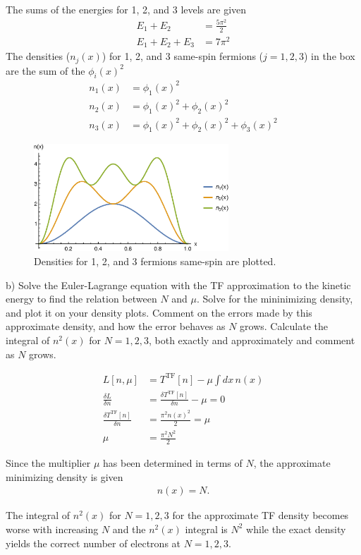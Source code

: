 \documentclass{article}
\begin{document}
{\color{blue} The sums of the energies for 1, 2, and 3 levels are given
  \begin{align}
    E_1 + E_2 & = \frac{5\pi^2}{2} \\
    E_1 + E_2 + E_3 & = 7\pi^2
  \end{align}
  The densities ($n_j(x)$) for 1, 2, and 3 same-spin fermions ($j=1,2,3$)
  in the box are the sum of the $\phi_i(x)^2$
  \begin{align}
    n_1(x) & = \phi_1(x)^2 \\
    n_2(x) & = \phi_1(x)^2 + \phi_2(x)^2 \\
    n_3(x) & = \phi_1(x)^2 + \phi_2(x)^2 + \phi_3(x)^2
  \end{align}
}
\begin{figure}[H]
  \centering
  \includegraphics[width=0.65\textwidth]{box_dens.eps}
  \caption{Densities for 1, 2, and 3 fermions same-spin are plotted.}
  \label{fig:box_dens}
\end{figure}

\noindent b) Solve the Euler-Lagrange equation with the TF approximation
to the kinetic energy to find the relation between $N$ and $\mu$.  Solve
for the mininimizing density, and plot it on your density plots.  Comment
on the errors made by this approximate density, and how the error behaves
as $N$ grows.  Calculate the integral of $n^2(x)$ for $N=1,2,3$, both exactly
and approximately and comment as $N$ grows.
\\

{\color{blue}
  \begin{align}
    L[n,\mu] & = T^{\text{TF}}[n] -\mu \int dx\, n(x) \\
    \frac{\delta L}{\delta n} & = \frac{\delta T^{\text{TF}}[n]}{\delta n} - \mu = 0 \\
    \frac{\delta T^{\text{TF}}[n]}{\delta n} & = \frac{\pi^2n(x)^2}{2} = \mu \\
    \mu & = \frac{\pi^2N^2}{2}
  \end{align}

  Since the multiplier $\mu$ has been determined in terms of $N$, the
  approximate minimizing density is given
  \begin{align}
    n(x) = N.
  \end{align}

  The integral of $n^2(x)$ for $N=1,2,3$ for the approximate TF density
  becomes worse with increasing $N$ and the $n^2(x)$ integral is $N^2$
  while the exact density yields the correct number of electrons at
  $N=1,2,3$.}
\end{document}
